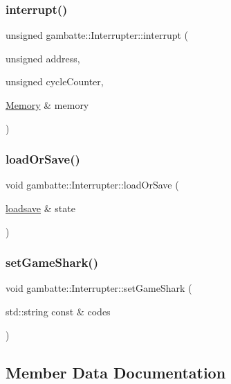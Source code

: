 \subsubsection{\texorpdfstring{interrupt()}{interrupt()}}
{\footnotesize\ttfamily unsigned gambatte\+::\+Interrupter\+::interrupt (\begin{DoxyParamCaption}\item[{unsigned}]{address,  }\item[{unsigned}]{cycle\+Counter,  }\item[{\hyperlink{classgambatte_1_1Memory}{Memory} \&}]{memory }\end{DoxyParamCaption})}

\mbox{\label{classgambatte_1_1Interrupter_a5d451c6ea015191f327fdbac59a22f2d}} 
\subsubsection{\texorpdfstring{load\+Or\+Save()}{loadOrSave()}}
{\footnotesize\ttfamily void gambatte\+::\+Interrupter\+::load\+Or\+Save (\begin{DoxyParamCaption}\item[{\hyperlink{classgambatte_1_1loadsave}{loadsave} \&}]{state }\end{DoxyParamCaption})}

\mbox{\label{classgambatte_1_1Interrupter_a8e0276566ebb30bdc152da124effb5ea}} 
\subsubsection{\texorpdfstring{set\+Game\+Shark()}{setGameShark()}}
{\footnotesize\ttfamily void gambatte\+::\+Interrupter\+::set\+Game\+Shark (\begin{DoxyParamCaption}\item[{std\+::string const \&}]{codes }\end{DoxyParamCaption})}



\subsection{Member Data Documentation}
\mbox{\label{classgambatte_1_1Interrupter_addc1ed44b825db658985d49290918353}} 
